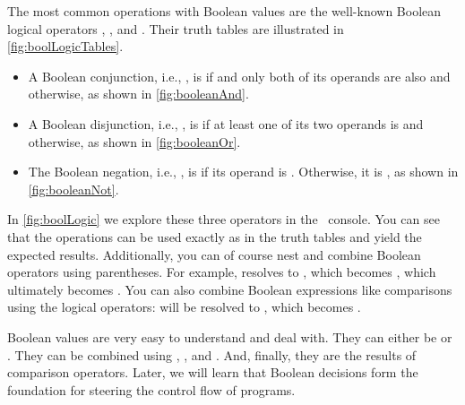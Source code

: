 %
The most common operations with Boolean values are the well-known Boolean logical operators , , and .
Their truth tables are illustrated in \cref{fig:boolLogicTables}.%
%
\begin{itemize}%
%
\item A Boolean conjunction, i.e., , is  if and only both of its operands are also  and  otherwise, as shown in \cref{fig:booleanAnd}.%
%
\item A Boolean disjunction, i.e., , is  if at least one of its two operands is  and  otherwise, as shown in \cref{fig:booleanOr}.%
%
\item The Boolean negation, i.e., , is  if its operand is . %
Otherwise, it is , as shown in \cref{fig:booleanNot}.%
%
\end{itemize}%
%
\begin{sloppypar}%
In \cref{fig:boolLogic} we explore these three operators in the \python\ console.
You can see that the operations can be used exactly as in the truth tables and yield the expected results.
Additionally, you can of course nest and combine Boolean operators using parentheses\pythonIdx{(}\pythonIdx{)}.
For example,  resolves to , which becomes , which ultimately becomes .
You can also combine Boolean expressions like comparisons using the logical operators:
 will be resolved to , which becomes .%
\end{sloppypar}%
%
\endhsection%
%
%
%
Boolean values are very easy to understand and deal with.
They can either be  or .
They can be combined using , , and .
And, finally, they are the results of comparison operators.
Later, we will learn that Boolean decisions form the foundation for steering the control flow of programs.%
%
\endhsection%
\endhsection%
%
